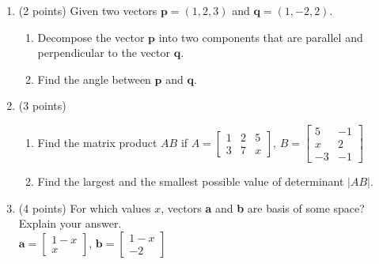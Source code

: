 \documentclass[]{exam}
\begin{document}
\begin{enumerate}
\large 




   

\item (2 points) Given two vectors $\textbf{p} = (1, 2, 3)$ and $\textbf{q} = (1, -2, 2)$. 
\begin{enumerate}
\item Decompose the vector $\textbf{p}$ into two components that are parallel and perpendicular to the vector $\textbf{q}$. 

\item Find the angle between $\textbf{p}$ and $\textbf{q}$.
\end{enumerate}

\item (3 points)
\begin{enumerate}
    \item Find the matrix product $AB$ if $A=\begin{bmatrix}1 & 2 & 5 \\ 3 & 7 & x \end{bmatrix}$, $B=\begin{bmatrix} 5 & -1 \\ x & 2 \\ -3 & -1 \end{bmatrix}$
    \item Find the largest and the smallest possible value of determinant $| AB |$.
\end{enumerate}

\item (4 points) For which values $x$, vectors \textbf{a} and \textbf{b} are basis of some space? Explain your answer. \\
$\textbf{a} =  \begin{bmatrix} 1-x \\ x  \end{bmatrix}$,
$\textbf{b} =  \begin{bmatrix} 1-x \\ -2     \end{bmatrix}$
\medskip


\end{enumerate}
\end{document}
